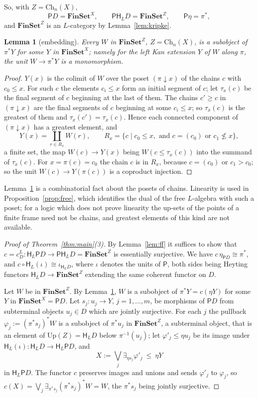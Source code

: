 \documentclass[11pt]{amsart}
\newtheorem{lem}[thm]{Lemma}
\theoremstyle{definition}
\newcommand{\Fin}{\mathbf{FinSet}}
\newcommand{\Up}{\mathrm{Up}}
\newcommand{\Ch}{\mathrm{Ch}}
\newcommand{\PP}{\mathsf P}
\newcommand{\HH}{\mathsf H}
\begin{document}
So, with $Z=\Ch_n(X)$,
\[
\PP D=\Fin^X,\qquad\PP\HH_LD=\Fin^Z,\qquad\PP\eta=\pi^*,
\]
and $\Fin^Z$ is an $L$-category by Lemma~\ref{lem:kripke}.

\begin{lem}[embedding]\label{lem:kan}
Every $W$ in $\Fin^Z$, $Z=\Ch_n(X)$, is a subobject of $\pi^*Y$ for
some $Y$ in $\Fin^X$; namely for the left Kan extension $Y$ of $W$
along $\pi$, the unit $W\to\pi^*Y$ is a monomorphism.
\end{lem}
\begin{proof}
$Y(x)$ is the colimit of $W$ over the poset $(\pi\!\downarrow\!x)$ of
the chains $c$ with $c_0\le x$. For such $c$ the elements $c_i\le x$
form an initial segment of $c$; let $\tau_x(c)$ be the final segment
of $c$ beginning at the last of them. The chains $c'\ge c$ in
$(\pi\!\downarrow\!x)$ are the final segments of $c$ beginning at some
$c_i\le x$; so $\tau_x(c)$ is the greatest of them and
$\tau_x(c')=\tau_x(c)$. Hence each connected component of
$(\pi\!\downarrow\!x)$ has a greatest element, and
\[
Y(x)=\coprod_{r\in R_x}W(r),\qquad R_x=\{c\mid c_0\le x,\text{ and }
c=(c_0)\text{ or }c_1\not\le x\},
\]
a finite set, the map $W(c)\to Y(x)$ being $W(c\le\tau_x(c))$ into the
summand of $\tau_x(c)$. For $x=\pi(c)=c_0$ the chain $c$ is in $R_x$,
because $c=(c_0)$ or $c_1>c_0$; so the unit $W(c)\to Y(\pi(c))$ is a coproduct
injection.
\end{proof}

Lemma~\ref{lem:kan} is a combinatorial fact about the posets of
chains. Linearity is used in Proposition~\ref{prop:free}, which
identifies the dual of the free $L$-algebra with such a poset; for a
logic which does not prove linearity the up-sets of the points of a
finite frame need not be chains, and greatest elements of this kind
are not available.

\begin{proof}[Proof of Theorem~\ref{thm:main}\textup{(3)}]
By Lemma~\ref{lem:ff} it suffices to show that $c=c^L_D\colon\HH_L\PP
D\to\PP\HH_LD=\Fin^Z$ is essentially surjective. We have $c\,\eta_{\PP
D}\cong\pi^*$, and $c\circ\HH_L(\iota)\cong\iota_{\HH_LD}$, where
$\iota$ denotes the units of $\PP$, both sides being Heyting functors
$\HH_LD\to\Fin^Z$ extending the same coherent functor on $D$.

Let $W$ be in $\Fin^Z$. By Lemma~\ref{lem:kan}, $W$ is a subobject of
$\pi^*Y=c(\eta Y)$ for some $Y$ in $\Fin^X=\PP D$. Let $s_j\colon
u_j\to Y$, $j=1,\dots,m$, be morphisms of $\PP D$ from subterminal
objects $u_j\in D$ which are jointly surjective. For each $j$ the
pullback $\varphi_j:=(\pi^*s_j)^*W$ is a subobject of $\pi^*u_j$ in
$\Fin^Z$, a subterminal object, that is an element of $\Up(Z)=\HH_LD$
below $\pi^{-1}(u_j)$; let $\varphi'_j\le\eta u_j$ be its image under
$\HH_L(\iota)\colon\HH_LD\to\HH_L\PP D$, and
\[
X:=\bigvee_j\exists_{\eta s_j}\varphi'_j\ \le\ \eta Y
\]
in $\HH_L\PP D$. The functor $c$ preserves images and unions and sends
$\varphi'_j$ to $\varphi_j$, so $c(X)=\bigvee_j\exists_{\pi^*s_j}
(\pi^*s_j)^*W=W$, the $\pi^*s_j$ being jointly surjective.
\end{proof}
\end{document}
